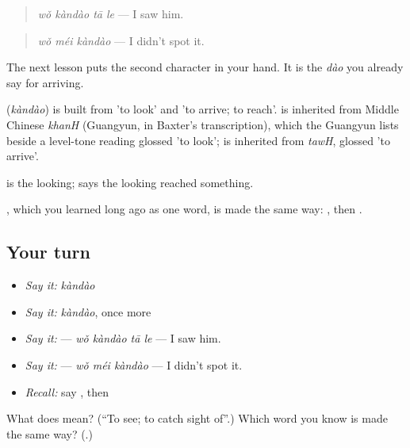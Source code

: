 \begin{quote}
\textbf{} \emph{wǒ kàndào tā le} — I saw him.
\end{quote}

\begin{quote}
\textbf{} \emph{wǒ méi kàndào} — I didn't spot it.
\end{quote}

The next lesson puts the second character in your hand. It is the \emph{dào} you already say for arriving.

\begin{cousinweb}
\textbf{} (\emph{kàndào}) is built from  'to look' and  'to arrive; to reach'.  is inherited from Middle Chinese \emph{khanH} (Guangyun, in Baxter's transcription), which the Guangyun lists beside a level-tone reading glossed 'to look';  is inherited from \emph{tawH}, glossed 'to arrive'.
\end{cousinweb}

\begin{grammarlens}[title={What you've built}]
 is the looking;  says the looking reached something.

, which you learned long ago as one word, is made the same way: , then .
\end{grammarlens}

\subsection*{Your turn}
\begin{itemize}
\raggedright
  \item \emph{Say it:} \emph{kàndào}
  \item \emph{Say it:} \emph{kàndào}, once more
  \item \emph{Say it:}  — \emph{wǒ kàndào tā le} — I saw him.
  \item \emph{Say it:}  — \emph{wǒ méi kàndào} — I didn't spot it.
  \item \emph{Recall:} say , then 
\end{itemize}

\begin{tcolorbox}[breakable,colback=teal!4,colframe=teal!35!black,title={Before you move on}]
What does  mean? (\textquotedblleft{}To see; to catch sight of\textquotedblright{}.) Which word you know is made the same way? (\textbf{}.)
\end{tcolorbox}

